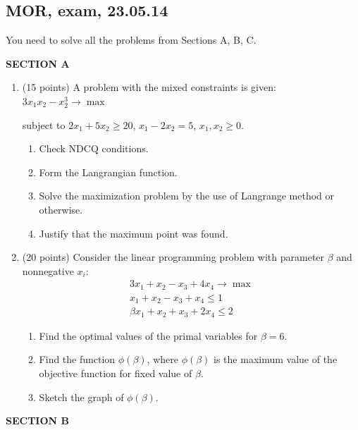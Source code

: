 \documentclass[12pt]{article} %
\theoremstyle{definition} %
\begin{document}
\subsection{MOR, exam, 23.05.14}

You need to solve all the problems from Sections A, B, C.

\pagestyle{empty}

\textbf{SECTION A}

\begin{enumerate}
\item (15 points) A problem with the mixed constraints is given: $3x_1 x_2-x_2^3 \to \max$

subject to $2x_1+5x_2 \geq 20$, $x_1-2x_2=5$, $x_1, x_2 \geq 0$.
\begin{enumerate}
\item Check NDCQ conditions.
\item  Form the Langrangian function.
\item Solve the maximization problem by the use of Langrange method or otherwise.
\item Justify that the maximum point was found.
\end{enumerate}
\item  (20 points)   Consider the linear programming problem with parameter $\beta$ and nonnegative $x_i$:
\begin{align*}
3x_1+x_2-x_3+4x_4 \to \max \\
x_1+x_2-x_3+x_4\leq 1 \\
\beta x_1+x_2+x_3+2x_4 \leq 2
\end{align*}

\begin{enumerate}
\item Find the optimal values of the primal variables for $\beta=6$.
\item Find the function $\phi(\beta)$, where $\phi(\beta)$  is the maximum value of the objective function for fixed value of $\beta$.
\item Sketch the graph of $\phi(\beta)$.
\end{enumerate}


\end{enumerate}

\textbf{SECTION B}
\end{document}
